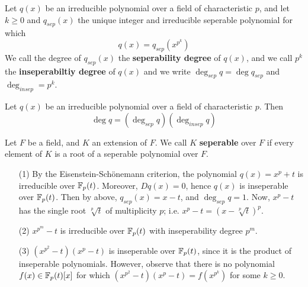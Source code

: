 \begin{definition}
  Let $q(x)$ be an irreducible polynomial over a field of
  characteristic $p$, and let $k \geq 0$ and $q_{sep}(x)$ the unique
  integer and irreducible seperable polynomial for which
  \begin{equation*}
    q(x)=q_{sep}(x^{p^k})
  \end{equation*}
  We call the degree of $q_{sep}(x)$ the \textbf{seperability degree}
  of $q(x)$, and we call $p^k$ the  \textbf{inseperabiltiy degree} of
  $q(x)$ and we write $\deg_{sep}{q}=\deg{q_{sep}}$ and
  $\deg_{insep}=p^k$.
\end{definition}

\begin{proposition}\label{proposition_8.6.7}
  Let $q(x)$ be an irreducible polynomial over a field of
  characteristic $p$. Then
  \begin{equation*}
    \deg{q}=(\deg_{sep}{q})(\deg_{insep}{q})
  \end{equation*}
\end{proposition}

\begin{definition}
  Let $F$ be a field, and $K$ an extension of $F$. We call  $K$
  \textbf{seperable} over $F$ if every element of  $K$ is a root of a
  seperable polynomial over  $F$.
\end{definition}

\begin{example}\label{example_8.16}
  \begin{enumerate}
    \item[(1)] By the Eisenstein-Sch\"onemann criterion, the
      polynomial $q(x)=x^p+t$ is irreducible over $\mathbb{F}_p(t)$. Moreover,
      $D{q(x)}=0$, hence $q(x)$ is inseperable over $\mathbb{F}_p(t)$. Then by
      above, $q_{sep}(x)=x-t$, and $\deg_{sep}{q}=1$. Now, $x^p-t$ has
      the single root  $\sqrt[p]{t}$ of multiplicity $p$; i.e.
      $x^p-t=(x-\sqrt[p]{t})^p$.

    \item[(2)] $x^{p^m}-t$ is irreducible over $\mathbb{F}_p(t)$ with
      inseperability degree $p^m$.

    \item[(3)] $(x^{p^2}-t)(x^p-t)$ is inseperable over $\mathbb{F}_p(t)$,
      since it is the product of inseperable polynomials. However,
      observe that there is no polynomial $f(x) \in \mathbb{F}_p(t)[x]$ for
      which $(x^{p^2}-t)(x^p-t)=f(x^{p^k})$ for some $k \geq 0$.
  \end{enumerate}
\end{example}

